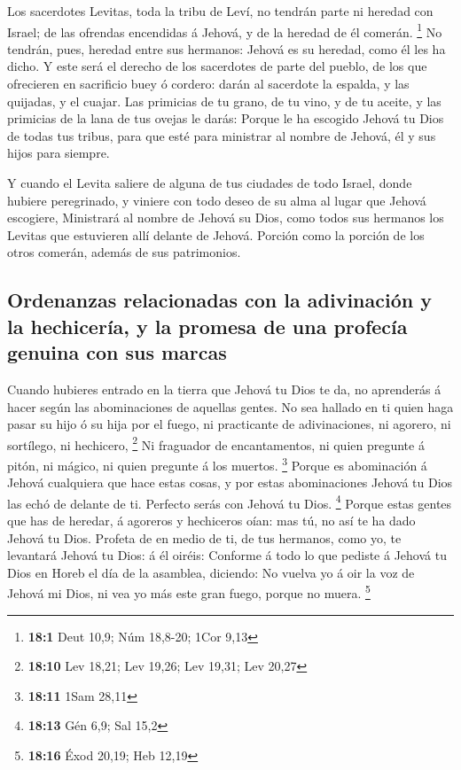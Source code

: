  Los sacerdotes Levitas, toda la tribu de Leví, no tendrán
parte ni heredad con Israel; de las ofrendas encendidas á Jehová, y de
la heredad de él comerán. \footnote{\textbf{18:1} Deut 10,9; Núm
  18,8-20; 1Cor 9,13}  No tendrán, pues, heredad entre sus
hermanos: Jehová es su heredad, como él les ha dicho.  Y
este será el derecho de los sacerdotes de parte del pueblo, de los que
ofrecieren en sacrificio buey ó cordero: darán al sacerdote la espalda,
y las quijadas, y el cuajar.  Las primicias de tu grano,
de tu vino, y de tu aceite, y las primicias de la lana de tus ovejas le
darás:  Porque le ha escogido Jehová tu Dios de todas tus
tribus, para que esté para ministrar al nombre de Jehová, él y sus hijos
para siempre.

 Y cuando el Levita saliere de alguna de tus ciudades de
todo Israel, donde hubiere peregrinado, y viniere con todo deseo de su
alma al lugar que Jehová escogiere,  Ministrará al nombre
de Jehová su Dios, como todos sus hermanos los Levitas que estuvieren
allí delante de Jehová.  Porción como la porción de los
otros comerán, además de sus patrimonios.

\hypertarget{ordenanzas-relacionadas-con-la-adivinaciuxf3n-y-la-hechiceruxeda-y-la-promesa-de-una-profecuxeda-genuina-con-sus-marcas}{%
\subsection{Ordenanzas relacionadas con la adivinación y la hechicería,
y la promesa de una profecía genuina con sus
marcas}\label{ordenanzas-relacionadas-con-la-adivinaciuxf3n-y-la-hechiceruxeda-y-la-promesa-de-una-profecuxeda-genuina-con-sus-marcas}}

 Cuando hubieres entrado en la tierra que Jehová tu Dios
te da, no aprenderás á hacer según las abominaciones de aquellas gentes.
 No sea hallado en ti quien haga pasar su hijo ó su hija
por el fuego, ni practicante de adivinaciones, ni agorero, ni sortílego,
ni hechicero, \footnote{\textbf{18:10} Lev 18,21; Lev 19,26; Lev 19,31;
  Lev 20,27}  Ni fraguador de encantamentos, ni quien
pregunte á pitón, ni mágico, ni quien pregunte á los muertos.
\footnote{\textbf{18:11} 1Sam 28,11}  Porque es
abominación á Jehová cualquiera que hace estas cosas, y por estas
abominaciones Jehová tu Dios las echó de delante de ti. 
Perfecto serás con Jehová tu Dios. \footnote{\textbf{18:13} Gén 6,9; Sal
  15,2}  Porque estas gentes que has de heredar, á
agoreros y hechiceros oían: mas tú, no así te ha dado Jehová tu Dios.
 Profeta de en medio de ti, de tus hermanos, como yo, te
levantará Jehová tu Dios: á él oiréis:  Conforme á todo
lo que pediste á Jehová tu Dios en Horeb el día de la asamblea,
diciendo: No vuelva yo á oir la voz de Jehová mi Dios, ni vea yo más
este gran fuego, porque no muera. \footnote{\textbf{18:16} Éxod 20,19;
  Heb 12,19}

